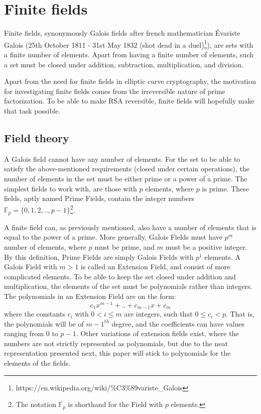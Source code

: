 \section{Finite fields}
\label{Galois} 
Finite fields, synonymously Galois fields after french mathematician Évariste Galois (25th October 1811 - 31st May 1832 (shot dead in a duel)\footnote{https://en.wikipedia.org/wiki/\%C3\%89variste\_Galois}), are sets with a finite number of elements. Apart from having a finite number of elements, such a set must be closed under addition, subtraction, multiplication, and division.

Apart from the need for finite fields in elliptic curve cryptography, the motivation for investigating finite fields comes from the irreversible nature of prime factorization. To be able to make RSA reversible, finite fields will hopefully make that task possible. 
\subsection{Field theory} %
A Galois field cannot have any number of elements. For the set to be able to satisfy the above-mentioned requirements (closed under certain operations), the number of elements in the set must be either prime or a power of a prime. The simplest fields to work with, are those with $p$ elements, where $p$ is prime. These fields, aptly named Prime Fields, contain the integer numbers $\mathbb{F}_p=\{0,1,2,..,p-1\}$\footnote{The notation $\mathbb{F}_p$ is shorthand for the Field with $p$ elements.}.

A finite field can, as previously mentioned, also have a number of elements that is equal to the power of a prime. More generally, Galois Fields must have $p^m$ number of elements, where $p$ must be prime, and $m$ must be a positive integer. By this definition, Prime Fields are simply Galois Fields with $p^1$ elements. A Galois Field with $m>1$ is called an Extension Field, and consist of more complicated elements. To be able to keep the set closed under addition and multiplication, the elements of the set must be polynomials rather than integers. The polynomials in an Extension Field are on the form:
\[c_1x^{m-1}+..+c_{m-1}x+c_{m}\]
where the constants $c_{i}$ with $0<i\leq m$ are integers, such that $0\leq c_{i}< p$. That is, the polynomials will be of $m-1^{th}$ degree, and the coefficients can have values ranging from $0$ to $p-1$. Other variations of extension fields exist, where the numbers are not strictly represented as polynomials, but due to the neat representation presented next, this paper will stick to polynomials for the elements of the fields.\\

